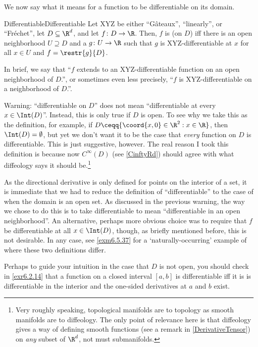We now say what it means for a function to be differentiable on its domain.
\begin{mdf}{Differentiable}{Differentiable}
Let XYZ be either ``Gâteaux'', ``linearly'', or ``Fréchet'', let $D\subseteq \R ^d$, and let $f\colon D\rightarrow \R$.  Then, $f$ is  (on $D$) iff there is an open neighborhood $U\supseteq D$ and a $g\colon U\rightarrow \R$ such that $g$ is XYZ-differentiable at $x$ for all $x\in U$ and $f=\restr{g}{D}$.
\begin{rmk}
In brief, we say that ``$f$ extends to an XYZ-differentiable function on an open neighborhood of $D$.'', or sometimes even less precisely, ``$f$ is XYZ-differentiable on a neighborhood of $D$.''.
\end{rmk}
\begin{wrn}
Warning:  ``differentiable on $D$'' does not mean ``differentiable at every $x\in \Int (D)$''.  Instead, this is only true if $D$ is open.  To see why we take this as the definition, for example, if $D\ceqq \{ \coord{x,0}\in \R ^2:x\in \R\}$, then $\Int (D)=\emptyset$, but yet we don't want it to be the case that \emph{every} function on $D$ is differentiable.  This is just suggestive, however.  The real reason I took this definition is because now $C^{\infty}(D)$ (see \cref{CinftyRd}) should agree with what diffeology says it should be.\footnote{Very roughly speaking, topological manifolds are to topology as smooth manifolds are to diffeology.  The only point of relevance here is that diffeology gives a way of defining smooth functions (see a remark in \cref{DerivativeTensor}) on \emph{any} subset of $\R ^d$, not must submanifolds.}
\end{wrn}
\begin{rmk}
As the directional derivative is only defined for points on the interior of a set, it is immediate that we had to reduce the definition of ``differentiable'' to the case of when the domain is an open set.  As discussed in the previous warning, the way we chose to do this is to take differentiable to mean ``differentiable in an open neighborhood''.  An alternative, perhaps more obvious choice was to require that $f$ be differentiable at all $x\in \Int (D)$, though, as briefly mentioned before, this is not desirable.  In any case, see \cref{exm6.5.37} for a `naturally-occurring' example of where these two definitions differ.
\end{rmk}
\begin{rmk}
Perhaps to guide your intuition in the case that $D$ is not open, you should check in \cref{exr6.2.14} that a function on a closed interval $[a,b]$ is differentiable iff it is is differentiable in the interior and the one-sided derivatives at $a$ and $b$ exist.
\end{rmk}
\end{mdf}
